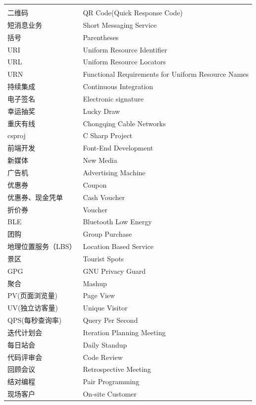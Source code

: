 \documentclass{book}
\begin{document}
\begin{longtable}{ll}
	\multirow{1}{*}{}			
	& \multicolumn{1}{c}{}\\
	二维码 & QR Code\footnotemark[1](Quick Response Code)\\
	短消息业务 & Short Messaging Service\\	
	括号 & Parentheses\\
	URI\footnotemark[2] & Uniform Resource Identifier\\
	URL\footnotemark[3] & Uniform Resource Locators\\
	URN\footnotemark[4] & Functional Requirements for Uniform Resource Names\\
	持续集成 & Continuous Integration\\	
	电子签名 & Electronic signature\\
	幸运抽奖 & Lucky Draw\\
	重庆有线 & Chongqing Cable Networks\\
	csproj & C Sharp Project\\
	前端开发 & Font-End Development\\
	新媒体 & New Media\\
	广告机 & Advertising Machine\\
	优惠券 & Coupon\\
	优惠券、现金凭单 & Cash Voucher\\
	折价券 & Voucher\\
	BLE & Bluetooth Low Energy\\
	团购 & Group Purchase\\
	地理位置服务（LBS） & Location Based Service\\
	景区 & Tourist Spots\\
	GPG & GNU Privacy Guard\\
	聚合 & Mashup\\
	PV(页面浏览量) & Page View\\
	UV(独立访客量) & Unique Visitor\\
	QPS(每秒查询率) & Query Per Second\\
	迭代计划会 & Iteration Planning Meeting\\
	每日站会 & Daily Standup\\
	代码评审会 & Code Review\\
	回顾会议 & Retrospective Meeting\\
	结对编程 & Pair Programming\\
	现场客户 & On-site Customer\\	
\end{longtable}
\end{document}
